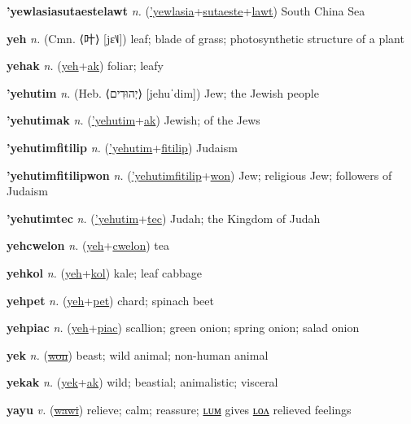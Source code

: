 \textbf{\hypertarget{'yewlasiasutaestelawt}{'yewlasiasutaestelawt}} \textit{n.} (\hyperlink{'yewlasia}{'yewlasia}+\allowbreak \hyperlink{sutaeste}{sutaeste}+\allowbreak \hyperlink{lawt}{lawt})
South China Sea

\textbf{\hypertarget{yeh}{yeh}} \textit{n.} (Cmn. ⟨{\chinese{}叶}⟩ [jɛ˥˩])
leaf; blade of grass; photosynthetic structure of a plant

\textbf{\hypertarget{yehak}{yehak}} \textit{n.} (\hyperlink{yeh}{yeh}+\allowbreak \hyperlink{ak}{ak})
foliar; leafy

\textbf{\hypertarget{'yehutim}{'yehutim}} \textit{n.} (Heb. ⟨{\hebrew{}יְהוּדִים}⟩ [jehuˈdim])
Jew; the Jewish people

\textbf{\hypertarget{'yehutimak}{'yehutimak}} \textit{n.} (\hyperlink{'yehutim}{'yehutim}+\allowbreak \hyperlink{ak}{ak})
Jewish; of the Jews

\textbf{\hypertarget{'yehutimfitilip}{'yehutimfitilip}} \textit{n.} (\hyperlink{'yehutim}{'yehutim}+\allowbreak \hyperlink{fitilip}{fitilip})
Judaism

\textbf{\hypertarget{'yehutimfitilipwon}{'yehutimfitilipwon}} \textit{n.} (\hyperlink{'yehutimfitilip}{'yehutimfitilip}+\allowbreak \hyperlink{won}{won})
Jew; religious Jew; followers of Judaism

\textbf{\hypertarget{'yehutimtec}{'yehutimtec}} \textit{n.} (\hyperlink{'yehutim}{'yehutim}+\allowbreak \hyperlink{tec}{tec})
Judah; the Kingdom of Judah

\textbf{\hypertarget{yehcwelon}{yehcwelon}} \textit{n.} (\hyperlink{yeh}{yeh}+\allowbreak \hyperlink{cwelon}{cwelon})
tea

\textbf{\hypertarget{yehkol}{yehkol}} \textit{n.} (\hyperlink{yeh}{yeh}+\allowbreak \hyperlink{kol}{kol})
kale; leaf cabbage

\textbf{\hypertarget{yehpet}{yehpet}} \textit{n.} (\hyperlink{yeh}{yeh}+\allowbreak \hyperlink{pet}{pet})
chard; spinach beet

\textbf{\hypertarget{yehpiac}{yehpiac}} \textit{n.} (\hyperlink{yeh}{yeh}+\allowbreak \hyperlink{piac}{piac})
scallion; green onion; spring onion; salad onion

\textbf{\hypertarget{yek}{yek}} \textit{n.} (\hyperlink{won}{\sout{won}})
beast; wild animal; non-human animal

\textbf{\hypertarget{yekak}{yekak}} \textit{n.} (\hyperlink{yek}{yek}+\allowbreak \hyperlink{ak}{ak})
wild; beastial; animalistic; visceral

\textbf{\hypertarget{yayu}{yayu}} \textit{v.} (\hyperlink{wawi}{\sout{wawi}})
relieve; calm; reassure; \hyperlink{yayulum}{ʟᴜᴍ} gives \hyperlink{yayulon}{ʟᴏᴧ} relieved feelings

